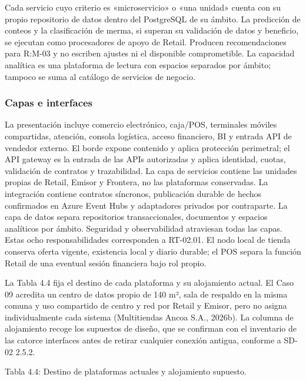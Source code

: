 \documentclass[11pt]{article}
\begin{document}
Cada servicio cuyo criterio es «microservicio» o «una unidad» cuenta con su propio repositorio de datos dentro del PostgreSQL de su ámbito. La predicción de conteos y la clasificación de merma, si superan su validación de datos y beneficio, se ejecutan como procesadores de apoyo de Retail. Producen recomendaciones para R:M-03 y no escriben ajustes ni el disponible comprometible. La capacidad analítica es una plataforma de lectura con espacios separados por ámbito; tampoco se suma al catálogo de servicios de negocio.

\subsubsection{Capas e interfaces}

La presentación incluye comercio electrónico, caja/POS, terminales móviles compartidas, atención, consola logística, acceso financiero, BI y entrada API de vendedor externo. El borde expone contenido y aplica protección perimetral; el API gateway es la entrada de las APIs autorizadas y aplica identidad, cuotas, validación de contratos y trazabilidad. La capa de servicios contiene las unidades propias de Retail, Emisor y Frontera, no las plataformas conservadas. La integración contiene contratos síncronos, publicación durable de hechos confirmados en Azure Event Hubs y adaptadores privados por contraparte. La capa de datos separa repositorios transaccionales, documentos y espacios analíticos por ámbito. Seguridad y observabilidad atraviesan todas las capas. Estas ocho responsabilidades corresponden a RT-02.01. El nodo local de tienda conserva oferta vigente, existencia local y diario durable; el POS separa la función Retail de una eventual sesión financiera bajo rol propio.

La Tabla 4.4 fija el destino de cada plataforma y su alojamiento actual. El Caso 09 acredita un centro de datos propio de 140 m², sala de respaldo en la misma comuna y uso compartido de centro y red por Retail y Emisor, pero no asigna individualmente cada sistema (Multitiendas Ancoa S.A., 2026b). La columna de alojamiento recoge los supuestos de diseño, que se confirman con el inventario de las catorce interfaces antes de retirar cualquier conexión antigua, conforme a SD-02 2.5.2.

Tabla 4.4: Destino de plataformas actuales y alojamiento supuesto.
\end{document}
